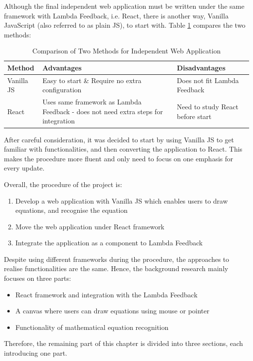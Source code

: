 \documentclass[12pt,twoside]{report}
\begin{document}
Although the final independent web application must be written under the same
framework with Lambda Feedback, i.e. React, there is another way,
Vanilla JavaScript (also referred to as plain JS), to start with. Table \ref{MethodComparison} compares the two methods:
\begin{table}[H]
    \centering
    \caption{Comparison of Two Methods for Independent Web Application}
    \label{MethodComparison}
    \begin{tabular}{|m{}|m{}|m{}|}
        \hline
        \textbf{Method} & \textbf{Advantages} & \textbf{Disadvantages}\\
        \hline
        Vanilla JS & Easy to start \& Require no extra configuration&
        Does not fit Lambda Feedback\\
        \hline
        React & Uses same framework as Lambda Feedback - does not need extra steps for integration & Need to study React before start\\
        \hline
    \end{tabular}
\end{table}
After careful consideration, it was decided to start by using Vanilla JS to get familiar with functionalities, and then converting the application to React. This makes the procedure more fluent and only need to focus on one emphasis for every update.

Overall, the procedure of the project is:
\begin{enumerate}
    \item Develop a web application with Vanilla JS which enables users to draw equations, and recognise the equation
    \item Move the web application under React framework
    \item Integrate the application as a component to Lambda Feedback
\end{enumerate}


Despite using different frameworks during the procedure, the approaches to realise functionalities are the same. Hence, the background research mainly focuses on three parts:
\begin{itemize}
    \item React framework and integration with the Lambda Feedback
    \item A canvas where users can draw equations using mouse or pointer
    \item Functionality of mathematical equation recognition
\end{itemize}
Therefore, the remaining part of this chapter is divided into three sections, each introducing one part. 
\end{document}
